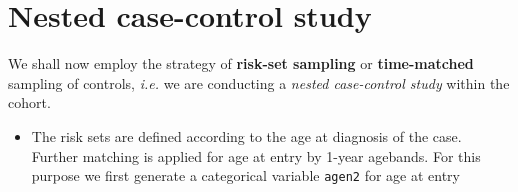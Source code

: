 \documentclass[
]{book}
\newenvironment{Shaded}{\begin{snugshade}}{\end{snugshade}}
\newcommand{\AttributeTok}[1]{\textcolor[rgb]{0.13,0.29,0.53}{#1}}
\newcommand{\ConstantTok}[1]{\textcolor[rgb]{0.56,0.35,0.01}{#1}}
\newcommand{\DecValTok}[1]{\textcolor[rgb]{0.00,0.00,0.81}{#1}}
\newcommand{\FunctionTok}[1]{\textcolor[rgb]{0.13,0.29,0.53}{\textbf{#1}}}
\newcommand{\NormalTok}[1]{#1}
\newcommand{\OtherTok}[1]{\textcolor[rgb]{0.56,0.35,0.01}{#1}}
\newcommand{\SpecialCharTok}[1]{\textcolor[rgb]{0.81,0.36,0.00}{\textbf{#1}}}
\newcommand{\StringTok}[1]{\textcolor[rgb]{0.31,0.60,0.02}{#1}}
\providecommand{\tightlist}{%
  \setlength{\itemsep}{0pt}\setlength{\parskip}{0pt}}
\begin{document}
\begin{Shaded}
\end{Shaded}

\section{Nested case-control study}\label{nested-case-control-study}

We shall now employ the strategy of \textbf{risk-set sampling}
or \textbf{time-matched} sampling of controls, \emph{i.e.}
we are conducting a \emph{nested case-control study}
within the cohort.

\begin{itemize}
\tightlist
\item
  The risk sets are defined according to the age at diagnosis of the case. Further matching is applied for age at entry by 1-year agebands.
  For this purpose we first generate a categorical variable
  \texttt{agen2} for age at entry
\end{itemize}

\begin{Shaded}
\end{Shaded}
\end{document}
